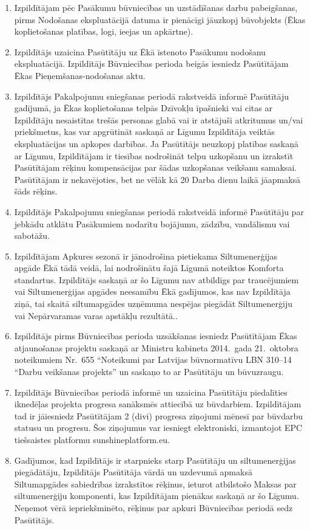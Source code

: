 \begin{multicols}{2}
\begin{enumerate}
	\item Izpildītājam pēc Pasākumu būvniecības un uzstādīšanas darbu pabeigšanas, pirms Nodošanas ekspluatācijā datuma ir pienācīgi jāuzkopj būvobjekts (Ēkas koplietošanas platības, logi, ieejas un apkārtne).
	\item Izpildītājs uzaicina Pasūtītāju uz Ēkā īstenoto Pasākumu nodošanu ekspluatācijā. Izpildītājs Būvniecības perioda beigās iesniedz Pasūtītājam Ēkas Pieņemšanas-nodošanas aktu.
	\item Izpildītājs Pakalpojumu sniegšanas periodā rakstveidā informē Pasūtītāju gadījumā, ja Ēkas koplietošanas telpās Dzīvokļu īpašnieki vai citas ar Izpildītāju nesaistītas trešās personas glabā vai ir atstājuši atkritumus un/vai priekšmetus, kas var apgrūtināt saskaņā  ar Līgumu Izpildītāja veiktās ekspluatācijas un apkopes darbības. Ja Pasūtītājs neuzkopj platības saskaņā ar Līgumu, Izpildītājam ir tiesības nodrošināt telpu uzkopšanu un izrakstīt Pasūtītājam rēķinu kompensācijas par šādas uzkopšanas veikšanu samaksai. Pasūtītājam ir nekavējoties, bet ne vēlāk kā 20 Darba dienu laikā jāapmaksā šāds rēķins.
	\item Izpildītājs Pakalpojumu sniegšanas periodā rakstveidā informē Pasūtītāju par jebkādu atklātu Pasākumiem nodarītu bojājumu, zādzību, vandālismu vai sabotāžu.
	\item Izpildītājam Apkures sezonā ir jānodrošina pietiekama Siltumenerģijas apgāde Ēkā tādā veidā, lai nodrošinātu šajā Līgumā noteiktos Komforta standartus. Izpildītājs saskaņā ar šo Līgumu nav atbildīgs par traucējumiem vai Siltumenerģijas apgādes neesamību Ēkā gadījumos, kas nav Izpildītāja ziņā, tai skaitā siltumapgādes uzņēmuma nespējas piegādāt Siltumenerģiju vai Nepārvaramas varas apstākļu rezultātā..
	\item Izpildītājs pirms Būvniecības perioda uzsākšanas iesniedz Pasūtītājam Ēkas atjaunošanas projektu saskaņā ar Ministru kabineta 2014.\ gada 21.\ oktobra noteikumiem Nr.\ 655 ``Noteikumi par Latvijas būvnormatīvu LBN 310--14 ``Darbu veikšanas projekts'' un saskaņo to ar Pasūtītāju un būvuzraugu.
	\item Izpildītājs Būvniecības periodā informē un uzaicina Pasūtītāju piedalīties iknedēļas projekta progresa sanāksmēs attiecībā uz būvdarbiem. Izpildītājam tad ir jāiesniedz Pasūtītājam 2 (divi) progresa ziņojumi mēnesī par būvdarbu statusu un progresu. Šos ziņojumus var iesniegt elektroniski, izmantojot EPC tiešsaistes platformu sunshineplatform.eu.
	\item Gadījumos, kad Izpildītājs ir starpnieks starp Pasūtītāju un siltumenerģijas piegādātāju, Izpildītājs Pasūtītāja vārdā un uzdevumā apmaksā Siltumapgādes sabiedrības izrakstītos rēķinus, ieturot atbilstošo Maksas par siltumenerģiju komponenti, kas Izpildītājam pienākas saskaņā ar šo Līgumu. Neņemot vērā iepriekšminēto, rēķinus par apkuri Būvniecības periodā sedz Pasūtītājs.

\end{enumerate}
\end{multicols}
